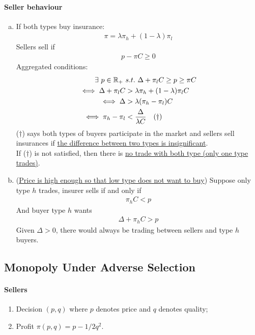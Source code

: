 \documentclass{article}
\begin{document}
   	\paragraph{Seller behaviour}
   	\begin{enumerate}[(a)]
   		\item If both types buy insurance:
   		\begin{align}
   			\pi = \lambda \pi_h + (1 - \lambda) \pi_l
   		\end{align}
   		Sellers sell if 
   		\begin{align}
   			p - \pi C \geq 0
   		\end{align}
   		Aggregated conditions:
   		\begin{align}
   			\exists\ p \in \mathbb{R}_+\ &s.t.\ \Delta + \pi_l C \geq p \geq \pi C \\
   			\iff \Delta + \pi_l C &> \lambda \pi_h + (1 - \lambda) \pi_l C \\
   			\iff \Delta &> \lambda (\pi_h - \pi_l) C \\
   			\iff \pi_h - \pi_l &< \frac{\Delta}{\lambda C}\quad (\dagger)
   		\end{align}
   		($\dagger$) says both types of buyers participate in the market and sellers sell insurances if \ul{the difference between two types is insignificant}. \\
   		If ($\dagger$) is not satisfied, then there is \ul{no trade with both type (only one type trades)}.
   		\item (\ul{Price is high enough so that low type does not want to buy}) Suppose only type $h$ trades, insurer sells if and only if 
   		\begin{align}
   			\pi _h C < p 
   		\end{align}
   		And buyer type $h$ wants
   		\begin{align}
   			\Delta + \pi_h C > p
   		\end{align}
   		Given $\Delta > 0$, there would always be trading between sellers and type $h$ buyers.
   	\end{enumerate}
   	
   	\subsection{Monopoly Under Adverse Selection}
   	\paragraph{Sellers}
   	\begin{enumerate}
   		\item Decision $(p, q)$ where $p$ denotes price and $q$ denotes quality;
   		\item Profit $\pi(p, q) = p - 1/2q^2$.
   	\end{enumerate}
\end{document}
